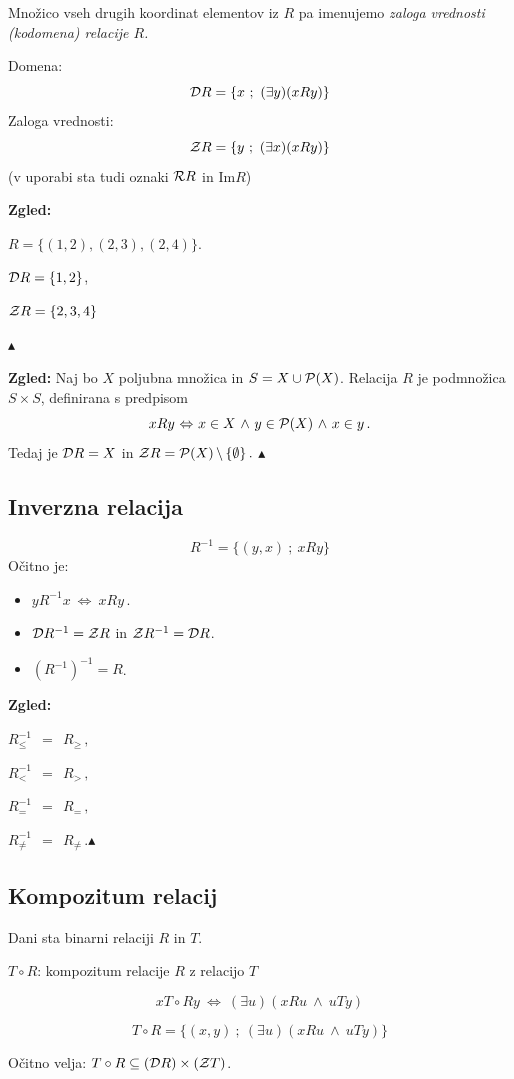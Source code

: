 \documentclass[11pt,paper=b5,footinclude,headinclude]{scrbook} %
\def\inn {{~\wedge~}}
\def\brez {{\,\setminus\,}}
\def\cee {{~\Leftrightarrow~}}
\def\zgled{\noindent\textbf{\color{blue} Zgled: }}
\def\kz{{\hfill{\color{blue}$\blacktriangle$}}}%
\begin{document}
Množico vseh drugih koordinat elementov iz $R$ pa imenujemo {\em zaloga vrednosti (kodomena) relacije $R$.}

Domena: $${\cal D}R = \{x~;~(\exists y)(xRy)\}$$
Zaloga vrednosti: $${\cal Z}R = \{y~;~(\exists x)(xRy)\}$$
(v uporabi sta tudi oznaki ${\cal R} R$ in $\textrm{Im} R$)

\medskip

\zgled

$R = \{(1,2), (2,3), (2,4)\}$.

${\cal D}R = \{1,2\}$,

${\cal Z}R = \{2,3,4\}$

\kz

 \zgled
Naj bo $X$ poljubna množica in $S = X\cup {\cal P}(X)$. Relacija $R$ je podmnožica $S\times S$, definirana s predpisom
$$xRy\cee x\in X\inn y\in {\cal P}(X) \inn x\in y\,.$$
Tedaj je ${\cal D}R = X$ in ${\cal Z}R = {\cal P}(X)\brez \{\emptyset\}\,.$
\kz


\subsection{ Inverzna relacija}
$$R^{-1}= \{(y,x)~;~xRy\}$$
Očitno je:
\begin{itemize}
  \item $yR^{-1}x \cee xRy\,.$
  \item ${\cal D}R^{-1} = {\cal Z}R$ in ${\cal Z}R^{-1} = {\cal D}R$.
    \item $(R^{-1})^{-1} = R$.
\end{itemize}


\bigskip
\zgled

 $R_\le^{-1}~~=~~R_\ge\,,$

 $R_<^{-1}~~=~~R_>\,,$

 $R_=^{-1}~~=~~R_=\,,$

$R_{\neq}^{-1}~~=~~R_{\neq}\,.$\kz


\subsection{Kompozitum relacij}

Dani sta binarni relaciji $R$ in $T$.

$T\circ R$: kompozitum relacije $R$ z relacijo $T$

$$x T\circ R y \cee (\exists u)(xRu\inn uTy)$$

$$T\circ R = \{(x,y)~;~(\exists u)(xRu\inn uTy)\}$$

Očitno velja: $T\circ R\subseteq ({\cal D}R)\times ({\cal Z}T)$.
\end{document}
